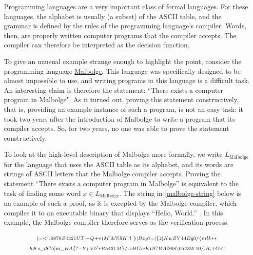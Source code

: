 \begin{example}Programming languages are a very important class of formal languages. For these languages, the alphabet is usually (a subset) of the ASCII table, and the grammar is defined by the rules of the programming language's compiler. Words, then, are  properly written computer programs that the compiler accepts. The compiler can therefore be interpreted as the decision function.

To give an unusual example strange enough to highlight the point, consider the programming language \href{https://en.wikipedia.org/wiki/Malbolge}{Malbolge}. This language was specifically designed to be almost impossible to use, and writing programs in this language is a difficult task. An interesting claim is therefore the statement: ``There exists a computer program in Malbolge". As it turned out, proving this statement constructively, that is, providing an example instance of such a program, is not an easy task: it took two years after the introduction of Malbolge to write a program that its compiler accepts. So, for two years, no one was able to prove the statement constructively.

To look at the high-level description of Malbolge more formally, we write $L_{\text{Malbolge}}$ for the language that uses the ASCII table as its alphabet, and its words are strings of ASCII letters that the Malbolge compiler accepts. Proving the statement ``There exists a computer program in Malbolge'' is equivalent to the task of finding some word $x\in L_{\text{Malbolge}}$. The string in \eqref{malbolge-string} below is an example of such a proof, as it is excepted by the Malbolge compiler, which compiles it to an executable binary that displays ``Hello, World.'' . In this example, the Malbolge compiler therefore serves as the verification process.

\begin{multline}\label{malbolge-string}
\scriptstyle (=<':9876Z4321UT.-Q+*)M'\&\%\$H"!~\}|Bzy?=|\{z]KwZY44Eq0/
\{mlk** \\ 
\scriptstyle hKs\_dG5[m\_BA\{?-Y;;Vb'rR5431M\}/.zHGwEDCBA@98\backslash 6543W10/.R,+O<
\end{multline}
\end{example}
